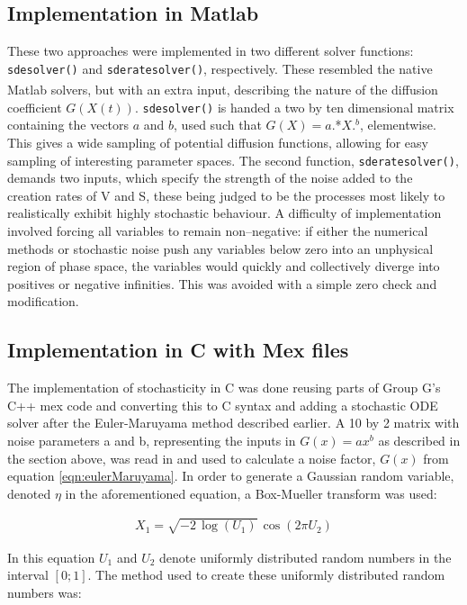 \documentclass[a4paper, 12pt]{report}
\begin{document}
\subsection{Implementation in Matlab\textsuperscript{\textregistered}}

These two approaches were implemented in two different solver functions: \texttt{sdesolver()} and \texttt{sderatesolver()}, respectively. These resembled the native Matlab\textsuperscript{\textregistered} solvers, but with an extra input, describing the nature of the diffusion coefficient $G(X(t))$. \texttt{sdesolver()} is handed a two by ten dimensional matrix containing the vectors $a$ and $b$, used such that $G(X)=a.$*$X.^b$, elementwise. This gives a wide sampling of potential diffusion functions, allowing for easy sampling of interesting parameter spaces. The second function, \texttt{sderatesolver()}, demands two inputs, which specify the strength of the noise added to the creation rates of V and S, these being judged to be the processes most likely to realistically exhibit highly stochastic behaviour. A difficulty of implementation involved forcing all variables to remain non--negative: if either the numerical methods or stochastic noise push any variables below zero into an unphysical region of phase space, the variables would quickly and collectively diverge into positives or negative infinities. This was avoided with a simple zero check and modification.

\subsection{Implementation in C with Mex files} %
The implementation of stochasticity in C was done reusing parts of Group G's C++ mex code and converting this to C syntax and adding a stochastic ODE solver after the Euler-Maruyama method described earlier. A 10 by 2 matrix with noise parameters a and b, representing the inputs in $G(x) = ax^b$ as described in the section above, was read in and used to calculate a noise factor, $G(x)$ from equation \eqref{eqn:eulerMaruyama}. In order to generate a Gaussian random variable, denoted $\eta$ in the aforementioned equation, a Box-Mueller transform \cite{box1958} was used:

\begin{align}
\label{eqn:boxMueller}
X_1 = \sqrt{ -2\, \log(U_1)}\, \cos(2 \pi U_2) 
\end{align}

In this equation $U_1$ and $U_2$ denote uniformly distributed random numbers in the interval $[0;1]$. The method used to create these uniformly distributed random numbers was: 
\end{document}
